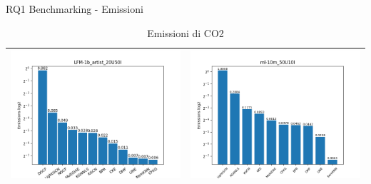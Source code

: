 \begin{frame}{RQ1 Benchmarking - Emissioni}
    \vspace{-0.9cm}
    \begin{table}[H]
        \centering
        \footnotesize
        \setlength\tabcolsep{0pt}
        \begin{tabularx}{\textwidth}{|X|X|}
            \hline
            \includegraphics[width=\linewidth, trim=0 0 0 0]{images/emissions_LFM-1b_artist_20U50I.png} &
            \includegraphics[width=\linewidth, trim=0 0 0 0]{images/emissions_ml-10m_50U10I.png} \\
            \hline
        \end{tabularx}
        \caption{Emissioni di CO2}
        \label{tab:emissions_info}
    \end{table}
\end{frame}

